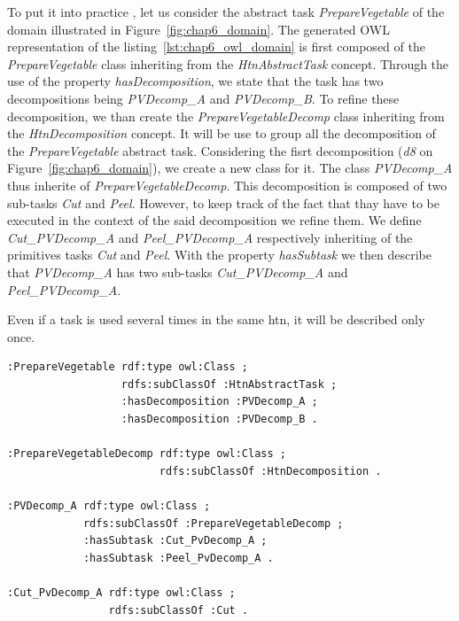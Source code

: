 To put it into practice , let us consider the abstract task \textit{PrepareVegetable} of the domain illustrated in Figure~\ref{fig:chap6_domain}. The generated OWL representation of the listing~\ref{lst:chap6_owl_domain} is first composed of the \textit{PrepareVegetable} class inheriting from the \textit{HtnAbstractTask} concept. Through the use of the property \textit{hasDecomposition}, we state that the task has two decompositions being \textit{PVDecomp\_A} and \textit{PVDecomp\_B}. To refine these decomposition, we than create the \textit{PrepareVegetableDecomp} class inheriting from the \textit{HtnDecomposition} concept. It will be use to group all the decomposition of the \textit{PrepareVegetable} abstract task. Considering the fisrt decomposition (\textit{d8} on Figure~\ref{fig:chap6_domain}), we create a new class for it. The class \textit{PVDecomp\_A} thus inherite of \textit{PrepareVegetableDecomp}. This decomposition is composed of two sub-tasks \textit{Cut} and \textit{Peel}.  However, to keep track of the fact that thay have to be executed in the context of the said decomposition we refine them. We define \textit{Cut\_PVDecomp\_A} and \textit{Peel\_PVDecomp\_A} respectively inheriting of the primitives tasks \textit{Cut} and \textit{Peel}. With the property \textit{hasSubtask} we then describe that \textit{PVDecomp\_A} has two sub-tasks \textit{Cut\_PVDecomp\_A} and \textit{Peel\_PVDecomp\_A}.

Even if a task is used several times in the same \acrshort{htn}, it will be described only once.

\begin{lstlisting}[frame=single, basicstyle=\scriptsize\ttfamily, label={lst:chap6_owl_domain}, caption={Description of the abstract task PrepareVegetable and one of its decomposition in the OWL language using the Turle syntax.},captionpos=b, style=OwlTurtle]
:PrepareVegetable rdf:type owl:Class ;
                  rdfs:subClassOf :HtnAbstractTask ;
                  :hasDecomposition :PVDecomp_A ;
                  :hasDecomposition :PVDecomp_B .

:PrepareVegetableDecomp rdf:type owl:Class ;
                        rdfs:subClassOf :HtnDecomposition .

:PVDecomp_A rdf:type owl:Class ;
            rdfs:subClassOf :PrepareVegetableDecomp ;
            :hasSubtask :Cut_PvDecomp_A ;
            :hasSubtask :Peel_PvDecomp_A .

:Cut_PvDecomp_A rdf:type owl:Class ;
                rdfs:subClassOf :Cut .
\end{lstlisting}

